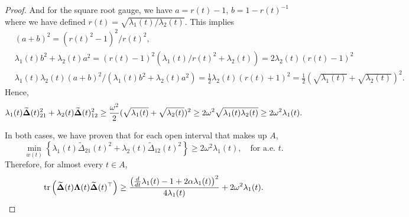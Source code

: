 \begin{proof}
And for the square root gauge, we have $a = r(t) - 1$, $b = 1 - r(t)^{-1}$ where we have defined $r(t) = 
\sqrt{\lambda_1(t) / \lambda_2(t)}$. This implies 
\begin{equation*}
    \begin{aligned}
        &(a+b)^2 = (r(t)^2 - 1)^2 / r(t)^2, \\ &\lambda_1(t) b^2 + \lambda_2(t) a^2  = (r(t) - 1)^2 (\lambda_1(t) / r(t)^2 + \lambda_2(t)) = 2 \lambda_2(t) (r(t) - 1)^2\\
        &\lambda_1(t) \lambda_2(t) (a+b)^2 / (\lambda_1(t) b^2 + \lambda_2(t) a^2) = \frac{1}{2}\lambda_2(t) (r(t) + 1)^2 = \frac{1}{2} (\sqrt{\lambda_1(t)} + \sqrt{\lambda_2(t)})^2.
    \end{aligned}
\end{equation*}
Hence, 
\begin{equation*}
    \lambda_1(t)\widetilde{\boldsymbol{\Delta}}(t)_{21}^2 + \lambda_2(t)\widetilde{\boldsymbol{\Delta}}(t)_{12}^2 \geq \frac{\omega^2}{2} (\sqrt{\lambda_1(t)} + \sqrt{\lambda_2(t)})^2 \geq 2 \omega^2 \sqrt{\lambda_1(t) \lambda_2(t)} \geq 2 \omega^2 \lambda_1(t).
\end{equation*}

In both cases, we have proven that for each open interval that makes up $A$,
\begin{equation*}
    \min_{w(t)}
    \left\{
        \lambda_1(t)\widetilde{\Delta}_{21}(t)^2
        +
        \lambda_2(t)\widetilde{\Delta}_{12}(t)^2
    \right\}
    \geq 
    2 \omega^2 \lambda_1(t), \quad \text{for a.e.~$t$}.
\end{equation*}
Therefore, for almost every $t\in A$,
\begin{equation*}
    \mathrm{tr}\left(
        \widetilde{\boldsymbol{\Delta}}(t)\boldsymbol{\Lambda}(t)\widetilde{\boldsymbol{\Delta}}(t)^\top
    \right)\geq
    \frac{\big(\frac{d}{dt}\lambda_1(t)-1+2\alpha \lambda_1(t)\big)^2}{4\lambda_1(t)}
    +
    2\omega^2\lambda_1(t).
\end{equation*}


\end{proof}
